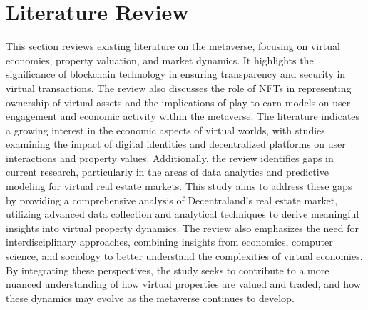 \section{Literature Review}
This section reviews existing literature on the metaverse, focusing on virtual economies, property valuation, and market dynamics. It highlights the significance of blockchain technology in ensuring transparency and security in virtual transactions. The review also discusses the role of NFTs in representing ownership of virtual assets and the implications of play-to-earn models on user engagement and economic activity within the metaverse.
The literature indicates a growing interest in the economic aspects of virtual worlds, with studies examining the impact of digital identities and decentralized platforms on user interactions and property values. Additionally, the review identifies gaps in current research, particularly in the areas of data analytics and predictive modeling for virtual real estate markets. This study aims to address these gaps by providing a comprehensive analysis of Decentraland's real estate market, utilizing advanced data collection and analytical techniques to derive meaningful insights into virtual property dynamics.
The review also emphasizes the need for interdisciplinary approaches, combining insights from economics, computer science, and sociology to better understand the complexities of virtual economies. By integrating these perspectives, the study seeks to contribute to a more nuanced understanding of how virtual properties are valued and traded, and how these dynamics may evolve as the metaverse continues to develop.